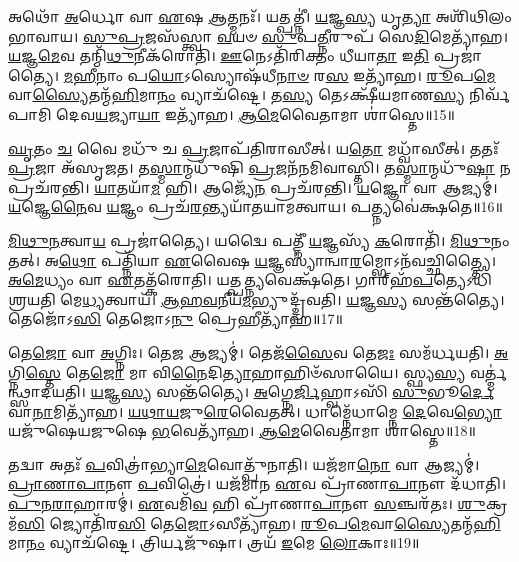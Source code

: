 𑌅𑌥𑍋᳴ \ul{𑌅}\-𑌰𑍍𑌧𑍋 𑌵𑌾 \ul{𑌏}\-𑌷 \ul{𑌆}\-𑌤𑍍𑌮𑌨𑌃᳴।
𑌯𑌤𑍍𑌪𑌤𑍍𑌨𑍀॑।
\-\ul{𑌯}\-𑌜𑍍𑌞\-\ul{𑌸𑍍𑌯} 𑌧𑍃\-\ul{𑌤𑍍𑌯𑌾} 𑌅𑌶𑌿᳴𑌥𑌿𑌲𑌂 𑌭𑌾𑌵𑌾𑌯।
\-\ul{𑌸𑍁}\-\-\ul{𑌪𑍍𑌰}\-𑌜𑌸᳴𑌸𑍍𑌤𑍍𑌵𑌾 \ul{𑌵}\-𑌯𑍞 \ul{𑌸𑍁}\-𑌪\-\ul{𑌤𑍍𑌨𑍀}\-𑌰𑍁𑌪᳴ 𑌸𑍇\-\ul{𑌦𑌿}\-𑌮𑍇𑌤𑍍𑌯𑌾᳴𑌹।
\-\ul{𑌯}\-𑌜𑍍𑌞\-\ul{𑌮𑍇}\-𑌵 𑌤𑌨𑍍𑌮𑌿᳴\-\ul{𑌥𑍁}\-𑌨𑍀𑌕᳴𑌰𑍋𑌤𑌿।
\-\ul{𑌊}\-𑌨𑍇𑌽𑌤𑌿᳴𑌰𑌿𑌕𑍍𑌤𑌂 𑌧𑍀𑌯𑌾\-\ul{𑌤𑌾} 𑌇\-\ul{𑌤𑌿} 𑌪𑍍𑌰𑌜𑌾॑𑌤𑍍𑌯𑍈।
\-\ul{𑌮}\-\-\ul{𑌹𑍀}\-𑌨𑌾𑌂 𑌪\-\ul{𑌯𑍋}\-\-𑌽𑌸𑍍𑌯𑍋𑌷᳴𑌧𑍀\-\ul{𑌨𑌾}\-\-\ul{𑍞} 𑌰\-\ul{𑌸} 𑌇𑌤𑍍𑌯𑌾᳴𑌹।
\-\ul{𑌰𑍂}\-𑌪\-\ul{𑌮𑍇}\-𑌵𑌾\-\ul{𑌸𑍍𑌯𑍈}\-𑌤𑌨𑍍𑌮᳴\-\ul{𑌹𑌿}\-𑌮𑌾\-\ul{𑌨𑌂} 𑌵𑍍𑌯𑌾𑌚᳴𑌷𑍍𑌟𑍇।
𑌤\-\ul{𑌸𑍍𑌯} 𑌤𑍇𑌽𑌕𑍍𑌷𑍀᳴𑌯𑌮𑌾𑌣\-\ul{𑌸𑍍𑌯} 𑌨𑌿𑌰𑍍𑌵᳴𑌪𑌾𑌮𑌿 𑌦𑍇𑌵\-\ul{𑌯}\-𑌜𑍍𑌯𑌾\-\ul{𑌯𑌾} 𑌇𑌤𑍍𑌯𑌾᳴𑌹।
\-\ul{𑌆}\-\-\-\ul{𑌮𑍇}\-𑌵𑍈𑌤𑌾𑌮𑌾 𑌶𑌾॑𑌸𑍍𑌤𑍇॥15॥\anuvakamend[\-\ul{𑌕}\-𑌰𑍋𑌤𑌿᳴ 𑌵𑍍𑌰𑌤𑍋\-\ul{𑌪}\-𑌨𑌯᳴\-\ul{𑌨𑌂} 𑌕𑍍𑌷𑍇\-\ul{𑌮𑍋} 𑌯𑌜᳴𑌮𑌾𑌨𑌃 𑌶𑌾𑌸𑍍𑌤𑍇]

\-\ul{𑌘𑍃}\-𑌤𑌂 \ul{𑌚} 𑌵𑍈 𑌮𑌧𑍁᳴ 𑌚 \ul{𑌪𑍍𑌰}\-𑌜𑌾𑌪᳴𑌤𑌿𑌰𑌾𑌸𑍀𑌤𑍍।
𑌯\-\ul{𑌤𑍋} 𑌮𑌧𑍍𑌵𑌾᳴𑌸𑍀𑌤𑍍।
𑌤𑌤𑌃᳴ \ul{𑌪𑍍𑌰}\-𑌜𑌾 𑌅᳴\-𑌸𑍃𑌜𑌤।
𑌤\-\ul{𑌸𑍍𑌮𑌾}\-𑌨𑍍𑌮𑌧𑍁᳴𑌷𑌿 \ul{𑌪𑍍𑌰}\-𑌜𑌨᳴𑌨𑌮𑌿𑌵𑌾𑌸𑍍𑌤𑌿।
𑌤\-\ul{𑌸𑍍𑌮𑌾}\-𑌨𑍍𑌮𑌧𑍁᳴\-\ul{𑌷𑌾} 𑌨 𑌪𑍍𑌰𑌚᳴𑌰𑌨𑍍𑌤𑌿।
\-\ul{𑌯𑌾}\-𑌤𑌯𑌾᳴\-\ul{𑌮} 𑌹𑌿।
𑌆𑌜𑍍𑌯𑍇᳴\-\ul{𑌨} 𑌪𑍍𑌰𑌚᳴𑌰𑌨𑍍𑌤𑌿।
\-\ul{𑌯}\-𑌜𑍍𑌞𑍋 𑌵𑌾 𑌆𑌜𑍍𑌯𑌮𑍍॑।
\-\ul{𑌯}\-𑌜𑍍𑌞𑍇\-\ul{𑌨𑍈}\-𑌵 \ul{𑌯}\-𑌜𑍍𑌞𑌂 𑌪𑍍𑌰𑌚᳴\-\ul{𑌰}\-𑌨𑍍𑌤𑍍𑌯𑌯𑌾᳴𑌤𑌯𑌾𑌮𑌤𑍍𑌵𑌾𑌯।
𑌪𑌤𑍍𑌨𑍍𑌯𑌵𑍇॑𑌕𑍍𑌷𑌤𑍇॥16॥

\-\ul{𑌮𑌿}\-\-\ul{𑌥𑍁}\-\-\ul{𑌨}\-𑌤𑍍𑌵𑌾\-\ul{𑌯} 𑌪𑍍𑌰𑌜𑌾॑𑌤𑍍𑌯𑍈।
𑌯𑌦𑍍𑌵𑍈 𑌪𑌤𑍍𑌨𑍀᳴ \ul{𑌯}\-𑌜𑍍𑌞𑌸𑍍𑌯᳴ \ul{𑌕}\-𑌰𑍋𑌤𑌿᳴।
\-\ul{𑌮𑌿}\-\-\ul{𑌥𑍁}\-𑌨𑌂 𑌤𑌤𑍍।
𑌅\-\ul{𑌥𑍋} 𑌪𑌤𑍍𑌨𑌿᳴𑌯𑌾 \ul{𑌏}\-𑌵𑍈𑌷 \ul{𑌯}\-𑌜𑍍𑌞𑌸𑍍𑌯𑌾॑𑌨𑍍𑌵𑌾\-\ul{𑌰}\-𑌮𑍍𑌭𑍋\-𑌽𑌨᳴𑌵𑌚𑍍𑌛𑌿𑌤𑍍𑌤𑍍𑌯𑍈।
\-\ul{𑌅}\-\-\ul{𑌮𑍇}\-𑌧𑍍𑌯𑌂 𑌵𑌾 \ul{𑌏}\-𑌤𑌤𑍍𑌕᳴𑌰𑍋𑌤𑌿।
𑌯𑌤𑍍𑌪\-\ul{𑌤𑍍𑌨𑍍𑌯}\-𑌵𑍇𑌕𑍍𑌷᳴𑌤𑍇।
𑌗𑌾𑌰𑍍‌\mbox{}𑌹᳴\-\ul{𑌪}\-𑌤𑍍𑌯𑍇𑌽𑌧𑌿᳴ 𑌶𑍍𑌰𑌯𑌤𑌿 𑌮𑍇\-\ul{𑌧𑍍𑌯}\-𑌤𑍍𑌵𑌾𑌯᳴।
\-\ul{𑌆}\-\-\ul{𑌹}\-\-\ul{𑌵}\-𑌨𑍀𑌯᳴\-\ul{𑌮}\-𑌭𑍍𑌯𑍁𑌦𑍍𑌦𑍍𑌰᳴𑌵𑌤𑌿।
\-\ul{𑌯}\-𑌜𑍍𑌞\-\ul{𑌸𑍍𑌯} 𑌸𑌨𑍍𑌤᳴𑌤𑍍𑌯𑍈।
𑌤𑍇𑌜𑍋᳴𑌽\-\ul{𑌸𑌿} 𑌤𑍇𑌜𑍋𑌽\-\ul{𑌨𑍁} 𑌪𑍍𑌰𑍇𑌹𑍀𑌤𑍍𑌯𑌾᳴𑌹॥17॥

𑌤𑍇\-\ul{𑌜𑍋} 𑌵𑌾 \ul{𑌅}\-𑌗𑍍𑌨𑌿𑌃।
𑌤𑍇\-\ul{𑌜} 𑌆𑌜𑍍𑌯𑌮𑍍॑।
𑌤𑍇𑌜᳴\-\ul{𑌸𑍈}\-𑌵 𑌤𑍇\-\ul{𑌜𑌃} 𑌸𑌮᳴𑌰𑍍𑌧𑌯𑌤𑌿।
\-\ul{𑌅}\-𑌗𑍍𑌨𑌿\-\ul{𑌸𑍍𑌤𑍇} 𑌤𑍇\-\ul{𑌜𑍋} 𑌮𑌾 𑌵𑌿\-\ul{𑌨𑍈}\-𑌦𑌿\-\ul{𑌤𑍍𑌯𑌾}\-𑌹𑌾𑌹𑌿𑍞᳴𑌸𑌾𑌯𑍈।
𑌸𑍍𑌫𑍍𑌯\-\ul{𑌸𑍍𑌯} 𑌵𑌰𑍍𑌤𑍍𑌮॑𑌨𑍍𑌥𑍍𑌸𑌾𑌦𑌯𑌤𑌿।
\-\ul{𑌯}\-𑌜𑍍𑌞\-\ul{𑌸𑍍𑌯} 𑌸𑌨𑍍𑌤᳴𑌤𑍍𑌯𑍈।
\-\ul{𑌅}\-𑌗𑍍𑌨𑍇\-\ul{𑌰𑍍𑌜𑌿}\-𑌹𑍍𑌵𑌾𑌽𑌸𑌿᳴ \ul{𑌸𑍁}\-𑌭𑍂\-\ul{𑌰𑍍𑌦𑍇}\-𑌵𑌾\-\ul{𑌨𑌾}\-𑌮𑌿𑌤𑍍𑌯𑌾᳴𑌹।
\-\ul{𑌯}\-\-\ul{𑌥𑌾}\-\-\ul{𑌯}\-𑌜𑍁\-\ul{𑌰𑍇}\-𑌵𑍈𑌤𑌤𑍍।
𑌧𑌾𑌮𑍍𑌨𑍇᳴𑌧𑌾𑌮𑍍𑌨𑍇 \ul{𑌦𑍇}\-𑌵𑍇\-\ul{𑌭𑍍𑌯𑍋} 𑌯𑌜𑍁᳴𑌷𑍇𑌯𑌜𑍁𑌷𑍇 \ul{𑌭}\-𑌵𑍇𑌤𑍍𑌯𑌾᳴𑌹।
\-\ul{𑌆}\-\-\-\ul{𑌮𑍇}\-𑌵𑍈𑌤𑌾𑌮𑌾 𑌶𑌾॑𑌸𑍍𑌤𑍇॥18॥

𑌤𑌦𑍍𑌵𑌾 𑌅𑌤𑌃᳴ \ul{𑌪}\-𑌵𑌿𑌤𑍍𑌰𑌾॑𑌭𑍍𑌯𑌾\-\ul{𑌮𑍇}\-𑌵𑍋𑌤𑍍𑌪𑍁᳴𑌨𑌾𑌤𑌿।
𑌯𑌜᳴𑌮𑌾\-\ul{𑌨𑍋} 𑌵𑌾 𑌆𑌜𑍍𑌯𑌮𑍍॑।
\-\ul{𑌪𑍍𑌰𑌾}\-\-\ul{𑌣𑌾}\-\-\ul{𑌪𑌾}\-𑌨𑍗 \ul{𑌪}\-𑌵𑌿𑌤𑍍𑌰𑍇॑।
𑌯𑌜᳴𑌮𑌾𑌨 \ul{𑌏}\-𑌵 𑌪𑍍𑌰𑌾᳴𑌣𑌾\-\ul{𑌪𑌾}\-𑌨𑍗 𑌦᳴𑌧𑌾𑌤𑌿।
\-\ul{𑌪𑍁}\-\-\ul{𑌨}\-\-\ul{𑌰𑌾}\-𑌹𑌾𑌰𑌮𑍍॑।
\-\ul{𑌏}\-𑌵𑌮𑌿᳴\-\ul{𑌵} 𑌹𑌿 𑌪𑍍𑌰𑌾᳴𑌣𑌾\-\ul{𑌪𑌾}\-𑌨𑍗 \ul{𑌸}\-𑌞𑍍𑌚𑌰᳴𑌤𑌃।
\-\ul{𑌶𑍁}\-𑌕𑍍𑌰𑌮᳴\-\ul{𑌸𑌿} 𑌜𑍍𑌯𑍋𑌤𑌿᳴𑌰\-\ul{𑌸𑌿} 𑌤𑍇\-\ul{𑌜𑍋}\-\-𑌽𑌸𑍀𑌤𑍍𑌯𑌾᳴𑌹।
\-\ul{𑌰𑍂}\-𑌪\-\ul{𑌮𑍇}\-𑌵𑌾\-\ul{𑌸𑍍𑌯𑍈}\-𑌤𑌨𑍍𑌮᳴\-\ul{𑌹𑌿}\-𑌮𑌾\-\ul{𑌨𑌂} 𑌵𑍍𑌯𑌾𑌚᳴𑌷𑍍𑌟𑍇।
𑌤𑍍𑌰𑌿𑌰𑍍𑌯𑌜𑍁᳴𑌷𑌾।
𑌤𑍍𑌰𑌯᳴ \ul{𑌇}\-𑌮𑍇 \ul{𑌲𑍋}\-𑌕𑌾𑌃॥19॥

